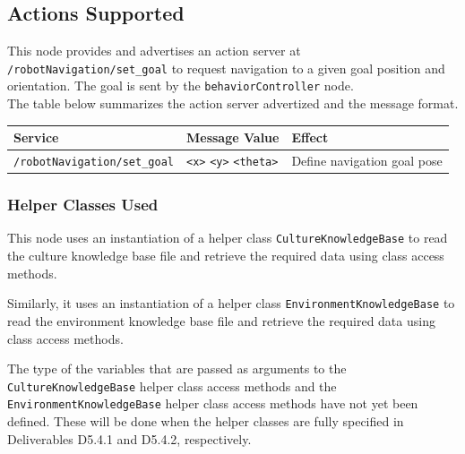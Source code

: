 \documentclass{CSSRforAfrica}
\begin{document}
{{\subsection*{Actions Supported}
This node provides and advertises an action server at {\small \verb+/robotNavigation/set_goal+} to request navigation to a given goal position and orientation.
The goal is sent by  the {\small \verb+behaviorController+} node. \\

The table below summarizes the action server advertized and the message format.

\begin{center}
\begin{tabularx}{\linewidth}{| l | l | X|}
\hline 
{\small Service }                                                                                & {\small Message Value}    &  {\small Effect}       \\
\hline
{\footnotesize \verb+/robotNavigation/set_goal+ }  & {\footnotesize \verb+<x>+ \verb+<y>+  \verb+<theta>+} & {\small Define navigation goal pose} \\ 
\hline
\end{tabularx}
\end{center}


\subsubsection*{Helper Classes Used}
This node  uses an instantiation of a helper class {\small \verb+CultureKnowledgeBase+}  to read the culture knowledge base file and retrieve the required data using  class access methods. 

Similarly, it uses  an instantiation of a helper class {\small \verb+EnvironmentKnowledgeBase+}  to read the environment knowledge base file and retrieve the required data using  class access methods.  


The type of the variables that are passed as  arguments to the 
{\small \verb+CultureKnowledgeBase+} helper class access methods and the 
{\small \verb+EnvironmentKnowledgeBase+} helper class access methods 
have not yet been defined. 
These will be done when the helper classes are fully specified in Deliverables D5.4.1 and D5.4.2, respectively.






}}
\end{document}
